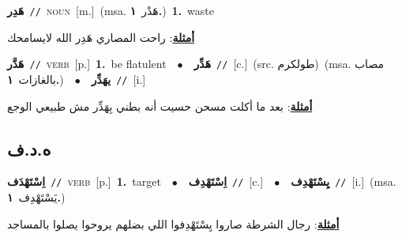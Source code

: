 \documentclass[10pt,a4paper,twoside]{article} %
\begin{document}
\begin{multicols}{2}
{\setlength\topsep{0pt}\textbf{\foreignlanguage{arabic}{هَدِر}}\ {\color{gray}\texttt{//}\color{black}}\ \textsc{noun}\ [m.]\ \color{gray}(msa. \foreignlanguage{arabic}{هَدْر}~\foreignlanguage{arabic}{\textbf{١.}})\color{black}\ \textbf{1.}~waste\  \begin{flushright}\color{gray}\foreignlanguage{arabic}{\textbf{\underline{\foreignlanguage{arabic}{أمثلة}}}: راحت المصاري هَدِر الله لايسامحك}\end{flushright}\color{black}} \vspace{2mm}

{\setlength\topsep{0pt}\textbf{\foreignlanguage{arabic}{هَدَّر}}\ {\color{gray}\texttt{//}\color{black}}\ \textsc{verb}\ [p.]\ \textbf{1.}~be flatulent\ \ $\bullet$\ \ \setlength\topsep{0pt}\textbf{\foreignlanguage{arabic}{هَدِّر}}\ {\color{gray}\texttt{//}\color{black}}\ [c.]\ (src. \color{gray}\foreignlanguage{arabic}{طولكرم}\color{black})\ \color{gray}(msa. \foreignlanguage{arabic}{مصاب بالغازات}~\foreignlanguage{arabic}{\textbf{١.}})\color{black}\ \ $\bullet$\ \ \setlength\topsep{0pt}\textbf{\foreignlanguage{arabic}{يهَدِّر}}\ {\color{gray}\texttt{//}\color{black}}\ [i.]\  \begin{flushright}\color{gray}\foreignlanguage{arabic}{\textbf{\underline{\foreignlanguage{arabic}{أمثلة}}}: بعد ما أكلت مسحن حسيت أنه بطني بِهَدِّر مش طبيعي الوجع}\end{flushright}\color{black}} \vspace{2mm}

\vspace{-3mm}
\subsection*{\color{blue}\foreignlanguage{arabic}{ه.د.ف}\color{blue}{}} 

{\setlength\topsep{0pt}\textbf{\foreignlanguage{arabic}{اِسْتَهْدَف}}\ {\color{gray}\texttt{//}\color{black}}\ \textsc{verb}\ [p.]\ \textbf{1.}~target\ \ $\bullet$\ \ \setlength\topsep{0pt}\textbf{\foreignlanguage{arabic}{اِسْتَهْدِف}}\ {\color{gray}\texttt{//}\color{black}}\ [c.]\ \ $\bullet$\ \ \setlength\topsep{0pt}\textbf{\foreignlanguage{arabic}{يِسْتَهْدِف}}\ {\color{gray}\texttt{//}\color{black}}\ [i.]\ \color{gray}(msa. \foreignlanguage{arabic}{يَسْتَهْدِف}~\foreignlanguage{arabic}{\textbf{١.}})\color{black}\  \begin{flushright}\color{gray}\foreignlanguage{arabic}{\textbf{\underline{\foreignlanguage{arabic}{أمثلة}}}: رجال الشرطة صاروا يِسْتَهْدِفوا اللي بضلهم يروحوا يصلوا بالمساجد}\end{flushright}\color{black}} \vspace{2mm}


\end{multicols}
\end{document}
